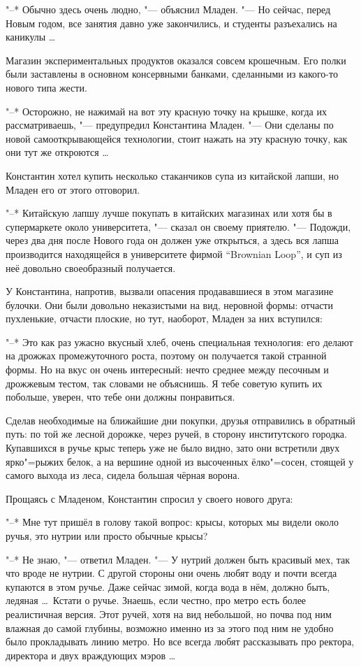 "--* Обычно здесь очень людно, "--- объяснил Младен.
"--- Но сейчас, перед Новым годом, все занятия давно уже закончились, и студенты
разъехались на каникулы \ldots

Магазин экспериментальных продуктов оказался совсем крошечным.
Его полки были заставлены в основном консервными банками, сделанными из
какого-то нового типа жести.

"--* Осторожно, не нажимай на вот эту красную точку на крышке, когда их
рассматриваешь, "--- предупредил Константина Младен.
"--- Они сделаны по новой самооткрывающейся технологии, стоит нажать на эту
красную точку, как они тут же откроются \ldots

Константин хотел купить несколько стаканчиков супа из китайской лапши, но Младен
его от этого отговорил.

"--* Китайскую лапшу лучше покупать в китайских магазинах или хотя бы в
супермаркете около университета, "--- сказал он своему приятелю.
"--- Подожди, через два дня после Нового года он должен уже открыться, а здесь
вся лапша производится находящейся в университете фирмой
\enquote{\foreignlanguage{english}{Brownian Loop}},
и суп из неё довольно своеобразный получается.

У Константина, напротив, вызвали опасения продававшиеся в этом магазине булочки.
Они были довольно неказистыми на вид, неровной формы: отчасти пухленькие,
отчасти плоские, но тут, наоборот, Младен за них вступился:

"--* Это как раз ужасно вкусный хлеб, очень специальная технология: его делают
на дрожжах промежуточного роста, поэтому он получается такой странной формы.
Но на вкус он очень интересный: нечто среднее между песочным и дрожжевым тестом,
так словами не объяснишь.
Я тебе советую купить их побольше, уверен, что тебе они должны понравиться.

Сделав необходимые на ближайшие дни покупки, друзья отправились в обратный путь:
по той же лесной дорожке, через ручей, в сторону институтского городка.
Купавшихся в ручье крыс теперь уже не было видно, зато они встретили двух
ярко"=рыжих белок, а на вершине одной из высоченных ёлко"=сосен, стоящей у
самого выхода из леса, сидела большая чёрная ворона.

Прощаясь с Младеном, Константин спросил у своего нового друга:

"--* Мне тут пришёл в голову такой вопрос: крысы, которых мы видели около ручья,
это нутрии или просто обычные крысы?

"--* Не знаю, "--- ответил Младен.
"--- У нутрий должен быть красивый мех, так что вроде не нутрии.
С другой стороны они очень любят воду и почти всегда купаются в этом ручье.
Даже сейчас зимой, когда вода в нём, должно быть, ледяная \ldots\
Кстати о ручье.
Знаешь, если честно, про метро есть более реалистичная версия.
Этот ручей, хотя на вид небольшой, но почва под ним влажная до самой глубины,
возможно именно из за этого под ним не удобно было прокладывать линию метро.
Но все всегда любят рассказывать про ректора, директора и двух враждующих
мэров \ldots

